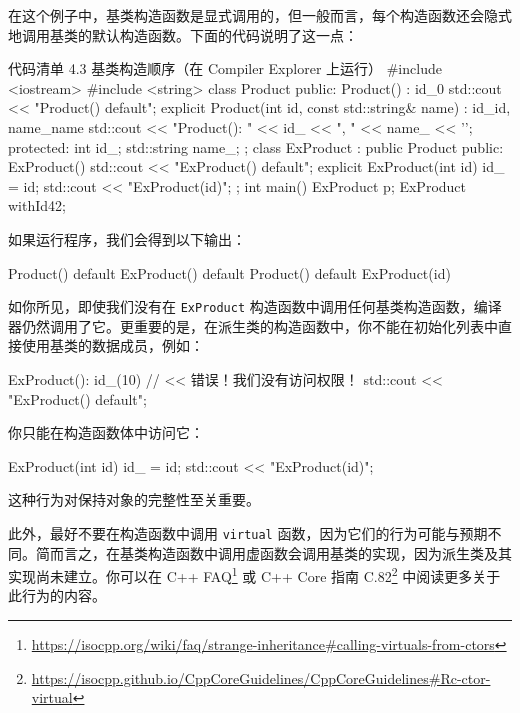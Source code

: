 在这个例子中，基类构造函数是显式调用的，但一般而言，每个构造函数还会隐式地调用基类的默认构造函数。下面的代码说明了这一点：

\begin{codeboxt}[cpp]{代码清单 4.3 基类构造顺序（在 Compiler Explorer 上运行）}
#include <iostream>
#include <string>
class Product {
public:
Product() : id_{0} { std::cout << "Product() default\n"; }
explicit Product(int id, const std::string& name)
: id_{id}, name_{name} {
std::cout << "Product(): " << id_ << ", " << name_ << '\n';
}
protected:
int id_;
std::string name_;
};
class ExProduct : public Product {
public:
ExProduct() { std::cout << "ExProduct() default\n"; }
explicit ExProduct(int id) {
id_ = id;
std::cout << "ExProduct(id)\n";
}
};
int main() {
ExProduct p;
ExProduct withId{42};
}
\end{codeboxt}

如果运行程序，我们会得到以下输出：

\begin{codebox}[cpp]
Product() default
ExProduct() default
Product() default
ExProduct(id)
\end{codebox}

如你所见，即使我们没有在 \texttt{ExProduct} 构造函数中调用任何基类构造函数，编译器仍然调用了它。更重要的是，在派生类的构造函数中，你不能在初始化列表中直接使用基类的数据成员，例如：

\begin{codebox}[cpp]
ExProduct(): id_(10) { // << 错误！我们没有访问权限！
std::cout << "ExProduct() default\n";
}
\end{codebox}

你只能在构造函数体中访问它：

\begin{codebox}[cpp]
ExProduct(int id) {
id_ = id;
std::cout << "ExProduct(id)\n";
}
\end{codebox}

这种行为对保持对象的完整性至关重要。

\begin{myWarnBox}
此外，最好不要在构造函数中调用 \texttt{virtual} 函数，因为它们的行为可能与预期不同。简而言之，在基类构造函数中调用虚函数会调用基类的实现，因为派生类及其实现尚未建立。你可以在 C++ FAQ\footnote{\url{https://isocpp.org/wiki/faq/strange-inheritance\#calling-virtuals-from-ctors}} 或 C++ Core 指南 C.82\footnote{\url{https://isocpp.github.io/CppCoreGuidelines/CppCoreGuidelines\#Rc-ctor-virtual}} 中阅读更多关于此行为的内容。
\end{myWarnBox}


